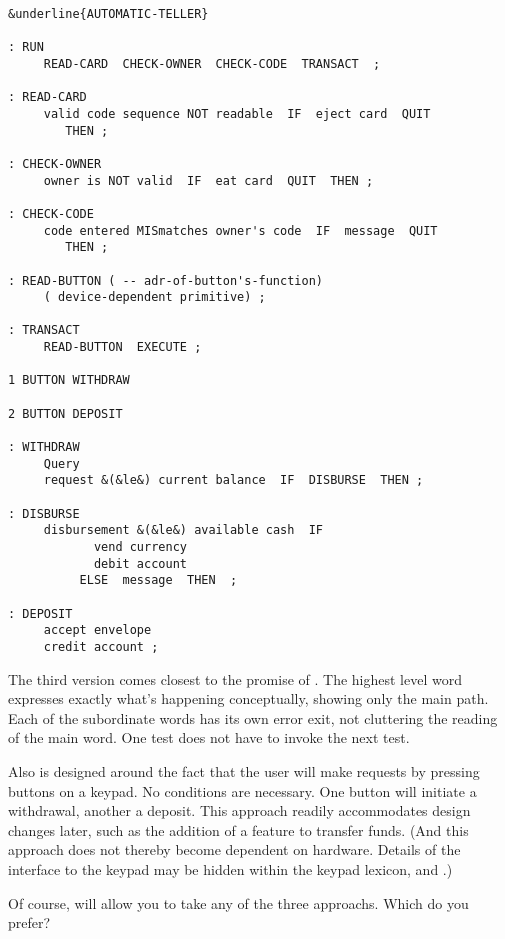 \begin{figure*}[tttt]
\begin{center}
\small\begin{BVerbatim}[commandchars=\&\{\},baselinestretch=0.85]
&underline{AUTOMATIC-TELLER}

: RUN
     READ-CARD  CHECK-OWNER  CHECK-CODE  TRANSACT  ;

: READ-CARD
     valid code sequence NOT readable  IF  eject card  QUIT
        THEN ;

: CHECK-OWNER
     owner is NOT valid  IF  eat card  QUIT  THEN ;

: CHECK-CODE
     code entered MISmatches owner's code  IF  message  QUIT
        THEN ;

: READ-BUTTON ( -- adr-of-button's-function)
     ( device-dependent primitive) ;

: TRANSACT
     READ-BUTTON  EXECUTE ;

1 BUTTON WITHDRAW

2 BUTTON DEPOSIT

: WITHDRAW
     Query
     request &(&le&) current balance  IF  DISBURSE  THEN ;

: DISBURSE
     disbursement &(&le&) available cash  IF
            vend currency
            debit account
          ELSE  message  THEN  ;

: DEPOSIT
     accept envelope
     credit account ;
\end{BVerbatim}
\end{center}
\end{figure*}

The third version comes closest to the promise of \Forth{}. The
highest level word expresses exactly what's happening conceptually,
showing only the main path. Each of the subordinate words has its own
error exit, not cluttering the reading of the main word. One test does not
have to invoke the next test.

Also  is designed around the fact that the user will
make requests by pressing buttons on a keypad. No conditions are
necessary. One button will initiate a withdrawal, another a deposit. This
approach readily accommodates design changes later, such as the addition
of a feature to transfer funds. (And this approach does not thereby
become dependent on hardware. Details of the interface to the keypad
may be hidden within the keypad lexicon,  and
.)

Of course, \Forth{} will allow you to take any of the three approachs.
Which do you prefer?

